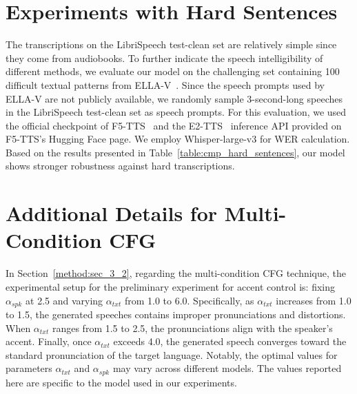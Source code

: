\section{Experiments with Hard Sentences}
The transcriptions on the LibriSpeech test-clean set are relatively simple since they come from audiobooks. To further indicate the speech intelligibility of different methods, we evaluate our model on the challenging set containing 100 difficult textual patterns from ELLA-V~\citep{song2024ella}. Since the speech prompts used by ELLA-V are not publicly available, we randomly sample 3-second-long speeches in the LibriSpeech test-clean set as speech prompts. For this evaluation, we used the official checkpoint of F5-TTS~\citep{chen2024f5} and the E2-TTS~\citep{eskimez2024e2} inference API provided on F5-TTS's Hugging Face page. We employ Whisper-large-v3 for WER calculation. Based on the results presented in Table~\ref{table:cmp_hard_sentences}, our model shows stronger robustness against hard transcriptions.

\section{Additional Details for Multi-Condition CFG}
\label{app:additional_detials_for_mt_cfg}
In Section~\ref{method:sec_3_2}, regarding the multi-condition CFG technique, the experimental setup for the preliminary experiment for accent control is: fixing $\alpha_{spk}$ at 2.5 and varying $\alpha_{txt}$ from 1.0 to 6.0. Specifically, as $\alpha_{txt}$ increases from 1.0 to 1.5, the generated speeches contains improper pronunciations and distortions. When $\alpha_{txt}$ ranges from 1.5 to 2.5, the pronunciations align with the speaker's accent. Finally, once $\alpha_{txt}$ exceeds 4.0, the generated speech converges toward the standard pronunciation of the target language. Notably, the optimal values for parameters $\alpha_{txt}$ and $\alpha_{spk}$ may vary across different models. The values reported here are specific to the model used in our experiments.




